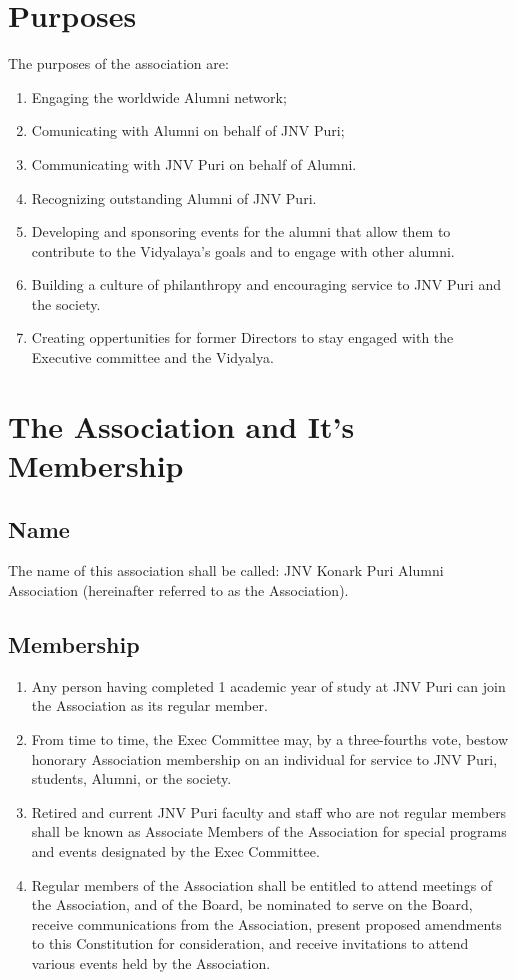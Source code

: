 \documentclass[a4paper,11pt]{book}
\begin{document}
\chapter{Purposes}
The purposes of the association are:
\begin{enumerate}
\item Engaging the worldwide Alumni network;
\item Comunicating with Alumni on behalf of JNV Puri;
\item Communicating with JNV Puri on behalf of Alumni.
\item Recognizing outstanding Alumni of JNV Puri.
\item Developing and sponsoring events for the alumni that allow them to 
contribute to the Vidyalaya's goals and to engage with other alumni.
\item Building a culture of philanthropy and encouraging service to JNV Puri 
and the society.
\item Creating oppertunities for former Directors to stay engaged with the 
Executive committee and the Vidyalya.
\end{enumerate}


\chapter{The Association and It's Membership}
\section{Name}
The name of this association shall be called: JNV Konark Puri Alumni 
Association (hereinafter referred to as the Association).

\section{Membership}
\begin{enumerate}
\item Any person having completed 1 academic year of study at JNV Puri can 
join the Association as its regular member.
\item From time to time, the Exec Committee may, by a three-fourths vote, 
bestow honorary Association membership on an individual for service to JNV Puri, 
students, Alumni, or the society.
\item Retired and current JNV Puri faculty and staff who are not regular members 
shall be known as Associate Members of the Association for special programs and 
events designated by the Exec Committee.
\item Regular members of the Association shall be entitled to attend meetings of 
the Association, and of the Board, be nominated to serve on the Board, receive 
communications from the Association, present proposed amendments to this 
Constitution for consideration, and receive invitations to attend various events 
held by the Association.
\end{enumerate}
\end{document}
